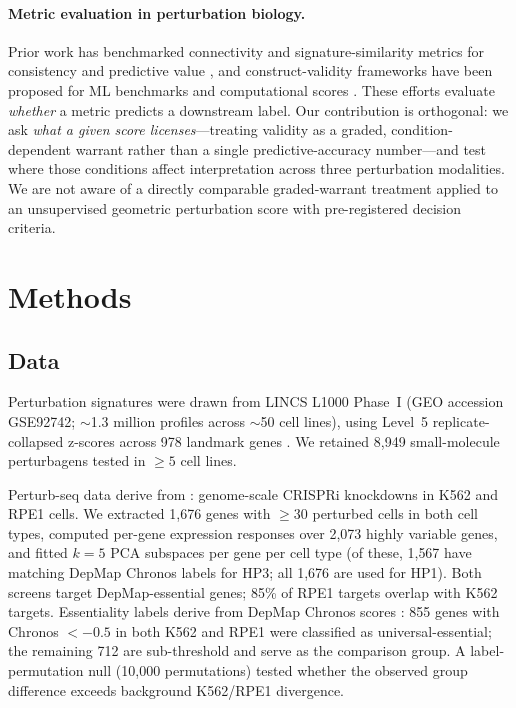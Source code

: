 \documentclass[11pt]{article}
\begin{document}
\paragraph{Metric evaluation in perturbation biology.}
Prior work has benchmarked connectivity and signature-similarity metrics
for consistency and predictive value
\citep{subramanian2017next,li2020comprehensive}, and construct-validity
frameworks have been proposed for ML benchmarks and computational scores
\citep{freiesleben2025benchmarking,watson2025measuring}. These efforts
evaluate \emph{whether} a metric predicts a downstream label. Our
contribution is orthogonal: we ask \emph{what a given score licenses}---treating
validity as a graded, condition-dependent warrant rather than a single
predictive-accuracy number---and test where those conditions affect
interpretation across three perturbation modalities. We are not aware of
a directly comparable graded-warrant treatment applied to an unsupervised
geometric perturbation score with pre-registered decision criteria.

\section{Methods}

\subsection{Data}

Perturbation signatures were drawn from LINCS L1000 Phase~I (GEO accession
GSE92742; $\sim$1.3 million profiles across $\sim$50 cell lines),
using Level~5 replicate-collapsed z-scores across 978 landmark genes
\citep{subramanian2017next}. We retained 8{,}949 small-molecule
perturbagens tested in $\geq5$ cell lines.

Perturb-seq data derive from \citet{replogle2022mapping}: genome-scale
CRISPRi knockdowns in K562 and RPE1 cells. We extracted 1{,}676 genes
with $\geq$30 perturbed cells in both cell types, computed per-gene
expression responses over 2{,}073 highly variable genes, and fitted
$k = 5$ PCA subspaces per gene per cell type (of these, 1{,}567 have
matching DepMap Chronos labels for HP3; all 1{,}676 are used for HP1).
Both screens target DepMap-essential genes; 85\% of RPE1 targets overlap
with K562 targets. Essentiality labels derive from DepMap Chronos scores
\citep{dempster2021chronos}: 855 genes with Chronos $< -0.5$ in both
K562 and RPE1 were classified as universal-essential; the remaining 712
are sub-threshold and serve as the comparison group. A label-permutation
null (10{,}000 permutations) tested whether the observed group difference
exceeds background K562/RPE1 divergence.
\end{document}
